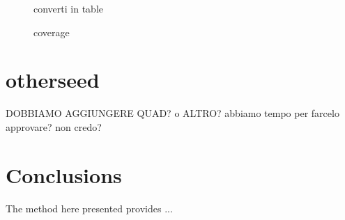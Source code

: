 \documentclass[a4paper]{jpconf}
\begin{document}
\begin{figure}[h]
\centering
{}
\caption{converti in table}
\label{fig:atable}
\end{figure}



\begin{figure}[h]
\centering
{}
\caption{coverage}
\label{fig:RZCoverage}
\end{figure}

\section{otherseed}

DOBBIAMO AGGIUNGERE QUAD? o ALTRO?
abbiamo tempo per farcelo approvare? non credo?

\section{Conclusions}
\label{section_conclusions}


The method here presented provides ...
\end{document}
